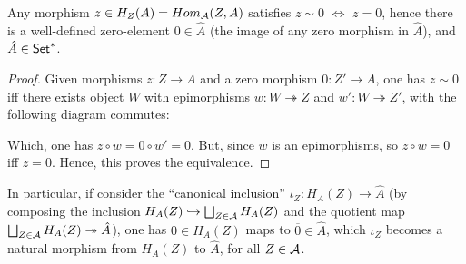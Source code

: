 \documentclass{article}
\begin{document}
\begin{lem}
    Any morphism $z\in H_Z(A) = Hom_{\cal{A}}(Z,A)$ satisfies $z\sim 0$ $\iff$ $z=0$, hence there is a well-defined zero-element $\overline{0}\in \hat{A}$ (the image of any zero morphism in $\hat{A}$), and $\hat{A}\in \mathsf{Set}^*$.
\end{lem}
\begin{proof}
    Given morphisms $z:Z\rightarrow A$ and a zero morphism $0:Z'\rightarrow A$, one has $z\sim 0$ iff there exists object $W$ with epimorphisms $w:W\twoheadrightarrow Z$ and $w':W\twoheadrightarrow Z'$, with the following diagram commutes:
    \begin{center}
    \end{center}
    Which, one has $z\circ w = 0\circ w' = 0$. But, since $w$ is an epimorphisms, so $z\circ w=0$ iff $z=0$. Hence, this proves the equivalence.
\end{proof}

In particular, if consider the ``canonical inclusion'' $\iota_Z: H_A(Z)\rightarrow \hat{A}$ (by composing the inclusion $H_A(Z)\hookrightarrow \bigsqcup_{Z\in\cal{A}}H_A(Z)$ and the quotient map $\bigsqcup_{Z\in\cal{A}}H_A(Z)\twoheadrightarrow \hat{A}$), one has $0\in H_A(Z)$ maps to $\overline{0}\in \hat{A}$, which $\iota_Z$ becomes a natural morphism from $H_A(Z)$ to $\hat{A}$, for all $Z\in\cal{A}$.

\hfil
\end{document}
